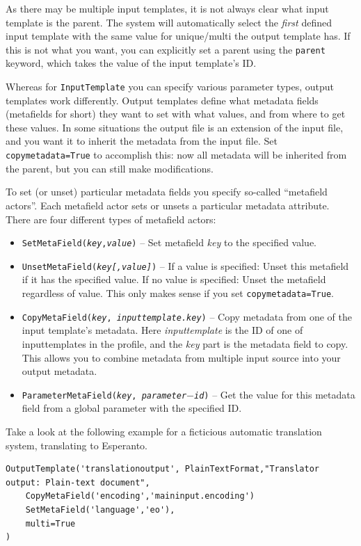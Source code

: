 \documentclass[a4paper,12pt]{report}
\begin{document}
As there may be multiple input templates, it is not always clear what input template is the parent. The system will automatically select the \emph{first} defined input template with the same value for unique/multi the output template has. If this is not what you want, you can explicitly set a parent using the \texttt{parent} keyword, which takes the value of the input template's ID.

Whereas for \texttt{InputTemplate} you can specify various parameter types, output templates work differently. Output templates define what metadata fields (metafields for short) they want to set with what values, and from where to get these values. In some situations the output file is an extension of the input file, and you want it to inherit the metadata from the input file. Set \texttt{copymetadata=True} to accomplish this: now all metadata will be inherited from the parent, but you can still make modifications.

To set (or unset) particular metadata fields you specify so-called ``metafield actors''. Each metafield actor sets or unsets a particular metadata attribute. There are four different types of metafield actors:

\begin{itemize}
\item \texttt{SetMetaField(\emph{key},\emph{value})} -- Set metafield \emph{key} to the specified value.
\item \texttt{UnsetMetaField(\emph{key}\emph{[,value]})} -- If a value is specified: Unset this metafield if it has the specified value. If no value is specified: Unset the metafield regardless of value. This only makes sense if you set \texttt{copymetadata=True}.
\item \texttt{CopyMetaField(\emph{key}, \emph{inputtemplate.key})} -- Copy metadata from one of the input template's metadata. Here \emph{inputtemplate} is the ID of one of inputtemplates in the profile, and the \emph{key} part is the metadata field to copy. This allows you to combine metadata from multiple input source into your output metadata.
\item \texttt{ParameterMetaField(\emph{key}, \emph{parameter$-$id})} -- Get the value for this metadata field from a global parameter with the specified ID.
\end{itemize}

Take a look at the following example for a ficticious automatic translation system, translating to Esperanto.

{\footnotesize{
\begin{verbatim}
OutputTemplate('translationoutput', PlainTextFormat,"Translator output: Plain-text document",  
    CopyMetaField('encoding','maininput.encoding')
    SetMetaField('language','eo'),
    multi=True
)
\end{verbatim}
}}
\end{document}
